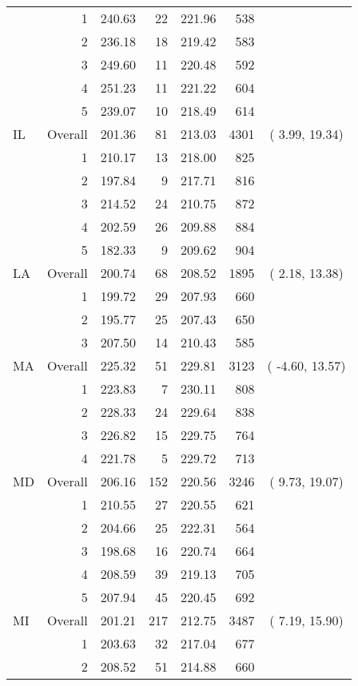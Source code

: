 \begin{longtable}{lrrr@{\extracolsep{.25cm}}rrc}
   & 1 & 240.63 &  22 & 221.96 & 538 &  \\ 
   & 2 & 236.18 &  18 & 219.42 & 583 &  \\ 
   & 3 & 249.60 &  11 & 220.48 & 592 &  \\ 
   & 4 & 251.23 &  11 & 221.22 & 604 &  \\ 
   & 5 & 239.07 &  10 & 218.49 & 614 &  \\ 
   \hline
IL & Overall & 201.36 &  81 & 213.03 & 4301 & (  3.99,  19.34) \\ 
   & 1 & 210.17 &  13 & 218.00 & 825 &  \\ 
   & 2 & 197.84 &   9 & 217.71 & 816 &  \\ 
   & 3 & 214.52 &  24 & 210.75 & 872 &  \\ 
   & 4 & 202.59 &  26 & 209.88 & 884 &  \\ 
   & 5 & 182.33 &   9 & 209.62 & 904 &  \\ 
   \hline
LA & Overall & 200.74 &  68 & 208.52 & 1895 & (  2.18,  13.38) \\ 
   & 1 & 199.72 &  29 & 207.93 & 660 &  \\ 
   & 2 & 195.77 &  25 & 207.43 & 650 &  \\ 
   & 3 & 207.50 &  14 & 210.43 & 585 &  \\ 
   \hline
MA & Overall & 225.32 &  51 & 229.81 & 3123 & ( -4.60,  13.57) \\ 
   & 1 & 223.83 &   7 & 230.11 & 808 &  \\ 
   & 2 & 228.33 &  24 & 229.64 & 838 &  \\ 
   & 3 & 226.82 &  15 & 229.75 & 764 &  \\ 
   & 4 & 221.78 &   5 & 229.72 & 713 &  \\ 
   \hline
MD & Overall & 206.16 & 152 & 220.56 & 3246 & (  9.73,  19.07) \\ 
   & 1 & 210.55 &  27 & 220.55 & 621 &  \\ 
   & 2 & 204.66 &  25 & 222.31 & 564 &  \\ 
   & 3 & 198.68 &  16 & 220.74 & 664 &  \\ 
   & 4 & 208.59 &  39 & 219.13 & 705 &  \\ 
   & 5 & 207.94 &  45 & 220.45 & 692 &  \\ 
   \hline
MI & Overall & 201.21 & 217 & 212.75 & 3487 & (  7.19,  15.90) \\ 
   & 1 & 203.63 &  32 & 217.04 & 677 &  \\ 
   & 2 & 208.52 &  51 & 214.88 & 660 &  \\ 

\end{longtable}
